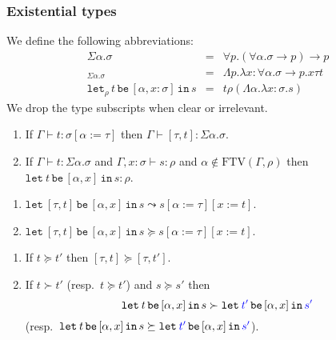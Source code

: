 \documentclass[runningheads,a4paper]{llncs}
\newcommand{\arrtype}{\rightarrow}
\newcommand{\abs}[2]{\lambda #1.#2}
\newcommand{\tabs}[2]{\Lambda #1.#2}
\newcommand{\expair}[2]{[#1,#2]}
\newcommand{\subst}[2]{#1:=#2}
\newcommand{\FTV}{\mathrm{FTV}}
\newcommand{\flatten}{\mathtt{flatten}}
\newcommand{\lift}{\mathtt{lift}}
\newcommand{\proves}{\vdash}
\newcommand{\xlet}[4]{\mathtt{let}_{#1}\,#2\,\mathtt{be}\,[#3]\,\mathtt{in}\,#4}
\newcommand{\CKchange}[1]{\textcolor{blue}{#1}}
\begin{document}
\subsubsection{Existential types}

\begin{definition}\normalfont
  We define the following abbreviations:
  \[
  \begin{array}{rcl}
    \Sigma \alpha . \sigma &=& \forall p . (\forall \alpha . \sigma \arrtype p) \arrtype p \\
    \expair{\tau}{t}_{\Sigma\alpha.\sigma} &=& \tabs{p}{\abs{x:\forall\alpha.\sigma\arrtype p}{x \tau t %
    }} \\
    \xlet{\rho}{t}{\alpha,x:\sigma}{s} &=& t \rho (\tabs{\alpha}{\abs{x:\sigma}{s}})
  \end{array}
  \]
  We drop the type subscripts when clear or irrelevant.
\end{definition}

\begin{lemma}
  \begin{enumerate}
  \item If $\Gamma \proves t : \sigma[\subst{\alpha}{\tau}]$ then
    $\Gamma \proves \expair{\tau}{t} : \Sigma \alpha . \sigma$.
  \item If $\Gamma \proves t : \Sigma \alpha . \sigma$ and
    $\Gamma,x:\sigma \proves s : \rho$ and $\alpha \notin
    \FTV(\Gamma,\rho)$ then $\xlet{}{t}{\alpha,x}{s} : \rho$.
  \end{enumerate}
\end{lemma}

\begin{lemma}\label{lem:extreduce}
  \begin{enumerate}
  \item $\xlet{}{\expair{\tau}{t}}{\alpha,x}{s} \leadsto
    s[\subst{\alpha}{\tau}][\subst{x}{t}] %
    $.
  \item $\xlet{}{\expair{\tau}{t}}{\alpha,x}{s} \succeq
    s[\subst{\alpha}{\tau}][\subst{x}{t}]$.
  \end{enumerate}
\end{lemma}

\begin{lemma}
  \begin{enumerate}
  \item If $t \succeq t'$ then $\expair{\tau}{t} \succeq
    \expair{\tau}{t'}$.
  \item If $t \succ t'$ (resp.~$t \succeq t'$) and $s \succeq s'$ then
    \[
    \xlet{}{t}{\alpha,x}{s} \succ \xlet{}{\CKchange{t'}}{\alpha,x}{\CKchange{s'}}
    \]
    (resp.~$\xlet{}{t}{\alpha,x}{s} \succeq \xlet{}{\CKchange{t'}}{\alpha,x}{\CKchange{s'}}$).
  \end{enumerate}
\end{lemma}
\end{document}
